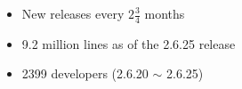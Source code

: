 \begin{frame}
  \begin{itemize}
  \item New releases every $2\frac{3}{4}$ months
  \item 9.2 million lines as of the 2.6.25 release
  \item 2399 developers (2.6.20 $\sim$ 2.6.25)
  \end{itemize}
\end{frame}



\begin{frame}%
  \begin{center}
  \end{center}
\end{frame}

\begin{frame}%
  \begin{center}
  \end{center}
\end{frame}

\begin{frame}%
  \begin{center}
  \end{center}
\end{frame}

